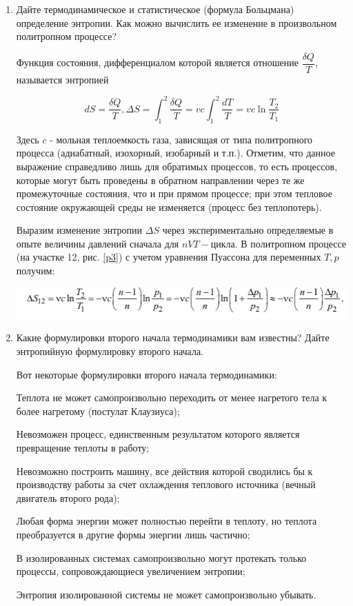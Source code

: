 \documentclass[12pt,a4paper]{article}%
\begin{document}
\begin{enumerate}
	\item Дайте термодинамическое и статистическое (формула Больцмана) определение энтропии. Как можно вычислить ее изменение в произвольном политропном процессе?
	
	Функция состояния, дифференциалом которой является отношение $\dfrac{\delta Q}{T}$, называется энтропией
	
	\begin{equation}
	dS = \dfrac{\delta Q}{T}, \varDelta S = \int_1^2{ \dfrac{\delta Q}{T}} = vc\int_1^2 \dfrac{dT}{T} = vc\ln{\dfrac{T_2}{T_1}}
	\end{equation}

	Здесь $c$ - мольная теплоемкость газа, зависящая от типа политропного процесса (адиабатный, изохорный, изобарный и т.п.). Отметим, что данное выражение справедливо лишь для обратимых процессов, то есть процессов, которые могут быть проведены в обратном направлении через те же промежуточные состояния, что и при прямом процессе; при этом тепловое состояние окружающей среды не изменяется (процесс без теплопотерь). 
	
	Выразим изменение энтропии $ \Delta S $ через экспериментально определяемые
	в опыте величины давлений сначала для $nVT-$цикла. В политропном процессе
	(на участке 12, рис. \ref{p3}) с учетом уравнения Пуассона для переменных $T, p$  получим: 
	
	\includegraphics[width=\linewidth]{p5}

	
	\item Какие формулировки второго начала термодинамики вам известны? Дайте энтропийную формулировку второго начала.
	
	Вот некоторые формулировки второго начала термодинамики: 
	
	Теплота не может самопроизвольно переходить от менее нагретого тела к более нагретому (постулат Клаузиуса); 
	
	Невозможен процесс, единственным результатом которого является превращение теплоты в работу; 
	
	Невозможно построить машину, все действия которой сводились бы к производству работы за счет охлаждения теплового источника (вечный двигатель второго рода); 
	
	Любая форма энергии может полностью перейти в теплоту, но теплота преобразуется в другие формы энергии лишь частично; 
	
	В изолированных системах самопроизвольно могут протекать только процессы, сопровождающиеся увеличением энтропии; 
	
	Энтропия изолированной системы не может самопроизвольно убывать.
	
\end{enumerate}
\end{document}
